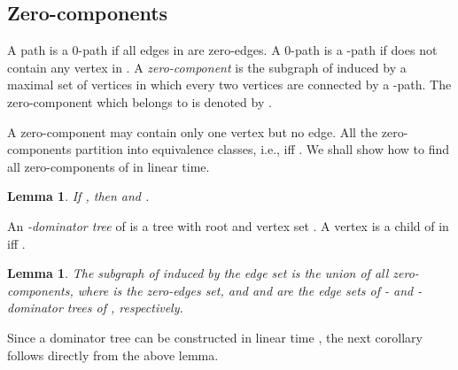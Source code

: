 \documentclass[review]{elsarticle}
\def\squarebox#1{\hbox to #1{\hfill\vbox to #1{\vfill}}}
\renewcommand{\qed}{\hspace*{\fill}
            \vbox{\hrule\hbox{\vrule\squarebox{.667em}\vrule}\hrule}\smallskip\newline}
\newtheorem{lem}[thm]{Lemma}
\begin{document}
\subsection{Zero-components}
\mbox{}

\begin{defi} A path  is a 0-path if all
edges in  are zero-edges. A 0-path  is a
-path if  does not contain any vertex in
. A {\em zero-component} is the subgraph
of  induced by a maximal set of vertices in which every two
vertices are connected by a -path. The zero-component which 
belongs to is denoted by .
\end{defi}

A zero-component may contain only one vertex but no edge. All the
zero-components partition  into equivalence classes, i.e.,
 iff . We shall show how to find all
zero-components of  in linear time.

\begin{lem}\label{zero-d}
If , then  and .
\end{lem}

An \emph{-dominator tree} \cite{als99} of  is a tree 
with root  and vertex set . A vertex  is a child of
 in  iff .
\begin{lem}
The subgraph of  induced by the edge set
 is the union of all zero-components, where
 is the zero-edges set, and  and  are the
edge sets of - and -dominator trees of , respectively.
\end{lem}

Since a dominator tree can be constructed in linear time
\cite{als99}, the next corollary follows directly from the above
lemma.
\end{document}
